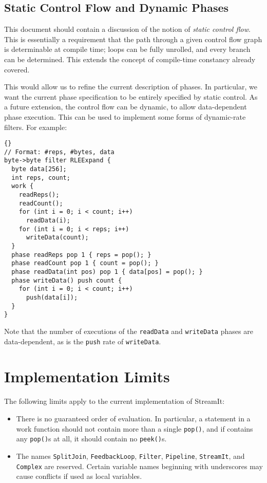 \documentclass[11pt]{article}
\begin{document}
\subsection{Static Control Flow and Dynamic Phases}

This document should contain a discussion of the notion of
\emph{static control flow}.  This is essentially a requirement that
the path through a given control flow graph is determinable at compile
time; loops can be fully unrolled, and every branch can be
determined.  This extends the concept of compile-time constancy
already covered.

This would allow us to refine the current description of phases.  In
particular, we want the current phase specification to be entirely
specified by static control.  As a future extension, the control flow
can be dynamic, to allow data-dependent phase execution.  This can be
used to implement some forms of dynamic-rate filters.  For example:

\begin{lstlisting}{}
// Format: #reps, #bytes, data
byte->byte filter RLEExpand {
  byte data[256];
  int reps, count;
  work {
    readReps();
    readCount();
    for (int i = 0; i < count; i++)
      readData(i);
    for (int i = 0; i < reps; i++)
      writeData(count);
  }
  phase readReps pop 1 { reps = pop(); }
  phase readCount pop 1 { count = pop(); }
  phase readData(int pos) pop 1 { data[pos] = pop(); }
  phase writeData() push count {
    for (int i = 0; i < count; i++)
      push(data[i]);
  }
}
\end{lstlisting}

Note that the number of executions of the \lstinline|readData| and
\lstinline|writeData| phases are data-dependent, as is the
\lstinline|push| rate of \lstinline|writeData|.

\section{Implementation Limits}

The following limits apply to the current implementation of StreamIt:

\begin{itemize}
\item There is no guaranteed order of evaluation.  In particular, a
  statement in a work function should not contain more than a single
  \lstinline|pop()|, and if contains any \lstinline|pop()|s at all, it
  should contain no \lstinline|peek()|s.
  
\item The names \lstinline|SplitJoin|, \lstinline|FeedbackLoop|,
  \lstinline|Filter|, \lstinline|Pipeline|, \lstinline|StreamIt|, and
  \lstinline|Complex| are reserved.  Certain variable names beginning
  with underscores may cause conflicts if used as local variables.

\end{itemize}
\end{document}
